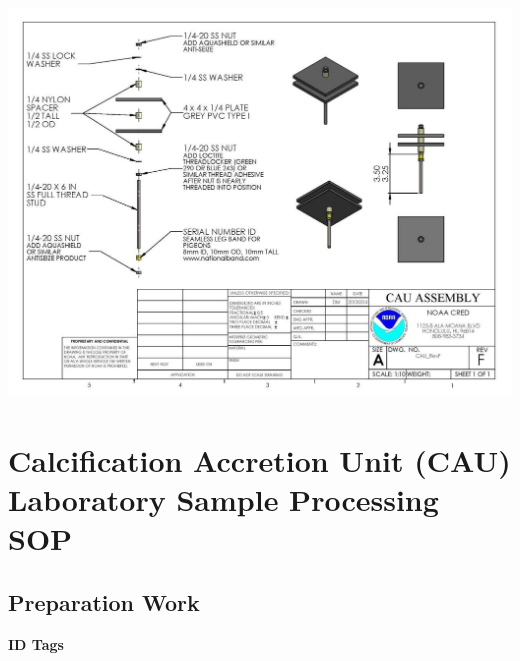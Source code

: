 \documentclass[]{book}
\begin{document}
\includegraphics{images/CAU_assembly.jpg}

\hypertarget{calcification-accretion-unit-cau-laboratory-sample-processing-sop}{%
\section{Calcification Accretion Unit (CAU) Laboratory Sample Processing SOP}\label{calcification-accretion-unit-cau-laboratory-sample-processing-sop}}

\hypertarget{preparation-work}{%
\subsection{Preparation Work}\label{preparation-work}}

\textbf{ID Tags}
\end{document}
